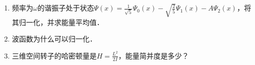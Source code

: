 
\subsection{ }
\begin{enumerate}
\item 频率为$\omega$的谐振子处于状态$\varPsi (x)=\frac{1}{\sqrt{5}}\varPsi_{0} (x)-\sqrt{\frac{2}{5}}\varPsi_{1} (x)-A\varPsi_2 (x)$，将其归一化，并求能量平均值．
\item 波函数为什么可以归一化．
\item 三维空间转子的哈密顿量是$H=\frac{L^{2}}{2I}$，能量简并度是多少？
\end{enumerate}
